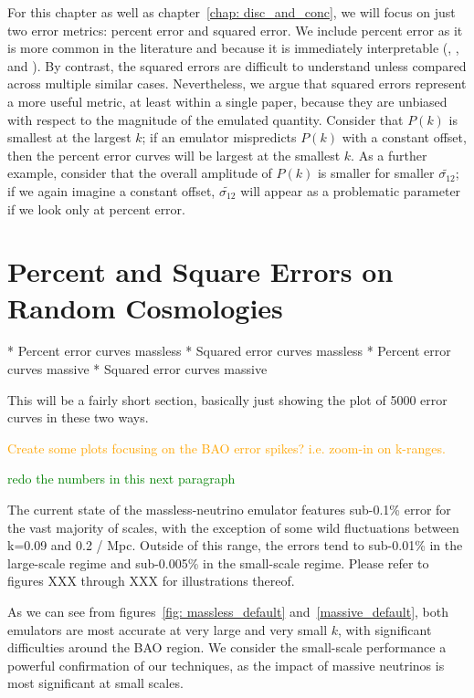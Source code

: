 For this chapter as well as chapter~\ref{chap: disc_and_conc}, we will focus
on just two error metrics: percent error and squared error. We include percent
error as it is more common in the literature and because it is immediately
interpretable (\citealp{Mancini}, \citealp{Arico}, and
\citealp{Eggemeier}). By contrast, the squared errors are difficult to
understand unless compared across multiple similar cases.
Nevertheless, we argue
that squared errors represent a more useful metric, at least within a single
paper, because they are unbiased with respect to the magnitude of the emulated
quantity. Consider that $P(k)$ is smallest at the largest $k$; if an emulator
mispredicts $P(k)$ with a constant offset, then the percent error curves will
be largest at the smallest $k$. As a further example, consider that the
overall amplitude of $P(k)$ is smaller for smaller $\tilde{\sigma_{12}}$;
if we again imagine a constant offset, $\tilde{\sigma_{12}}$ will appear as a
problematic parameter if we look only at percent error.


\section{Percent and Square Errors on Random Cosmologies}

* Percent error curves massless
* Squared error curves massless
* Percent error curves massive
* Squared error curves massive

This will be a fairly short section, basically just showing the plot of 5000 
error curves in these two ways.

\textcolor{orange}{Create some plots focusing on the BAO error spikes? i.e.
zoom-in on k-ranges.}

\textcolor{green}{redo the numbers in this next paragraph}

The current state of the massless-neutrino emulator features sub-0.1\% error 
for the vast majority of scales, with the exception of some wild fluctuations  
between k=0.09 and 0.2 / Mpc. Outside of this range, the errors tend to 
sub-0.01\% in the large-scale regime and sub-0.005\% in the small-scale 
regime. Please refer to figures XXX through XXX for illustrations thereof.

As we can see from figures~\ref{fig: massless_default} 
and~\ref{massive_default}, both emulators are most accurate at very large and
very small $k$, with significant difficulties around the BAO region. We
consider the small-scale performance a powerful confirmation of our
techniques, as the impact of massive neutrinos is most significant at small
scales.

